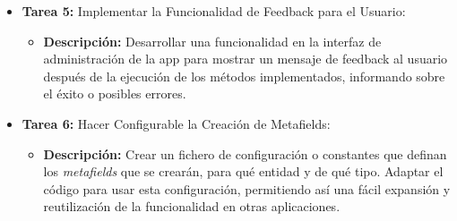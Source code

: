 \documentclass[11pt]{article}
\begin{document}
\begin{itemize}
\begin{itemize}[label=--]
          \end{itemize}
    \item \textbf{Tarea 5:} Implementar la Funcionalidad de Feedback para el Usuario:
          \begin{itemize}[label=--]
              \item \textbf{Descripción:} Desarrollar una funcionalidad en la interfaz de administración de la app para mostrar un mensaje de feedback al usuario después de la ejecución de los métodos implementados, informando sobre el éxito o posibles errores.
          \end{itemize}
    \item \textbf{Tarea 6:} Hacer Configurable la Creación de Metafields:
          \begin{itemize}[label=--]
              \item \textbf{Descripción:} Crear un fichero de configuración o constantes que definan los \textit{metafields} que se crearán, para qué entidad y de qué tipo. Adaptar el código para usar esta configuración, permitiendo así una fácil expansión y reutilización de la funcionalidad en otras aplicaciones.
          \end{itemize}
\end{itemize}
\end{document}

